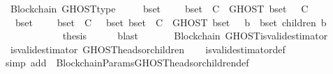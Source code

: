 \begin{isabellebody}
\isanewline
{}\isamarkupfalse%
\ {\isacharparenleft}\ Blockchain{\isacharparenright}\ GHOST{\isacharunderscore}type\ {\isacharcolon}\isanewline
\ \ {\isachardoublequoteopen}{\isasymforall}\ {\isasymsigma}\ b{\isacharunderscore}set{\isachardot}\ {\isasymsigma}\ {\isasymin}\ {\isasymSigma}\ {\isasymand}\ b{\isacharunderscore}set\ {\isasymsubseteq}\ C\ {\isasymlongrightarrow}\ GHOST\ {\isacharparenleft}b{\isacharunderscore}set{\isacharcomma}\ {\isasymsigma}{\isacharparenright}\ {\isasymsubseteq}\ C{\isachardoublequoteclose}\isanewline
%
\isadelimproof
%
\endisadelimproof
%
\isatagproof
{}\isamarkupfalse%
\ {\isacharminus}\ \isanewline
\ \ \isanewline
\ \ \isamarkupfalse%
\ {\isachardoublequoteopen}{\isasymforall}\ {\isasymsigma}\ b{\isacharunderscore}set{\isachardot}\ {\isasymsigma}\ {\isasymin}\ {\isasymSigma}\ {\isasymand}\ b{\isacharunderscore}set\ {\isasymsubseteq}\ C\ {\isasymlongrightarrow}\ {\isacharparenleft}{\isasymexists}\ b{\isacharunderscore}set{\isacharprime}{\isachardot}\ b{\isacharunderscore}set{\isacharprime}\ {\isasymsubseteq}\ C\ {\isasymand}\ GHOST\ {\isacharparenleft}b{\isacharunderscore}set{\isacharcomma}\ {\isasymsigma}{\isacharparenright}\ {\isacharequal}\ {\isacharbraceleft}b\ {\isasymin}\ b{\isacharunderscore}set{\isacharprime}{\isachardot}\ children\ {\isacharparenleft}b{\isacharcomma}\ {\isasymsigma}{\isacharparenright}\ {\isacharequal}\ {\isasymemptyset}{\isacharbraceright}{\isacharparenright}{\isachardoublequoteclose}\ \ \ \ \isanewline
\ \ \ \ \isamarkupfalse%
\isanewline
\ \ \isamarkupfalse%
\ \isamarkupfalse%
\ {\isacharquery}thesis\isanewline
\ \ \ \ \isamarkupfalse%
\ blast\isanewline
{}\isamarkupfalse%
%
\endisatagproof
{\isafoldproof}%
%
\isadelimproof
\ \ \ \ \isanewline
%
\endisadelimproof
\isanewline
\isanewline
{}\isamarkupfalse%
\ {\isacharparenleft}\ Blockchain{\isacharparenright}\ GHOST{\isacharunderscore}is{\isacharunderscore}valid{\isacharunderscore}estimator\ {\isacharcolon}\isanewline
\ \ {\isachardoublequoteopen}is{\isacharunderscore}valid{\isacharunderscore}estimator\ GHOST{\isacharunderscore}heads{\isacharunderscore}or{\isacharunderscore}children{\isachardoublequoteclose}\isanewline
%
\isadelimproof
\ \ %
\endisadelimproof
%
\isatagproof
{}\isamarkupfalse%
\ is{\isacharunderscore}valid{\isacharunderscore}estimator{\isacharunderscore}def\isanewline
\ \ \isamarkupfalse%
\ {\isacharparenleft}simp\ add{\isacharcolon}\ \ BlockchainParams{\isachardot}GHOST{\isacharunderscore}heads{\isacharunderscore}or{\isacharunderscore}children{\isacharunderscore}def{\isacharparenright}\isanewline

\end{isabellebody}
